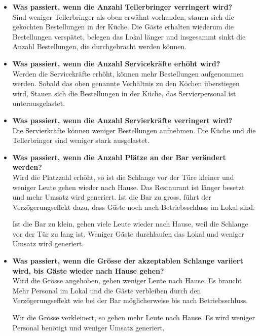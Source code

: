 \documentclass[ngerman,a4paper,12pt]{scrreprt}
\begin{document}
\begin{itemize}
			\item \textbf{Was passiert, wenn die Anzahl Tellerbringer verringert wird?}\\
				Sind weniger Tellerbringer als oben erwähnt vorhanden, stauen sich die gekochten Bestellungen in der Küche. Die Gäste erhalten wiederum die Bestellungen verspätet, belegen das Lokal länger und insgesammt sinkt die Anzahl Bestellungen, die durchgebracht werden können.
			\item \textbf{Was passiert, wenn die Anzahl Servicekräfte erhöht wird?}\\
				Werden die Servicekräfte erhöht, können mehr Bestellungen aufgenommen werden. Sobald das oben genannte Verhältnis zu den Köchen überstiegen wird, Stauen sich die Bestellungen in der Küche, das Servierpersonal ist unterausgelastet.
			\item \textbf{Was passiert, wenn die Anzahl Servierkräfte verringert wird?}\\
				Die Servierkräfte können weniger Bestellungen aufnehmen. Die Küche und die Tellerbringer sind weniger stark ausgelastet.
			\item \textbf{Was passiert, wenn die Anzahl Plätze an der Bar verändert werden?}\\
				Wird die Platzzahl erhöht, so ist die Schlange vor der Türe kleiner und weniger Leute gehen wieder nach Hause. Das Restaurant ist länger besetzt und mehr Umsatz wird generiert. Ist die Bar zu gross, führt der Verzögerungseffekt dazu, dass Gäste noch nach Betriebsschluss im Lokal sind.
				
				Ist die Bar zu klein, gehen viele Leute wieder nach Hause, weil die Schlange vor der Tür zu lang ist. Weniger Gäste durchlaufen das Lokal und weniger Umsatz wird generiert.
			\item \textbf{Was passiert, wenn die Grösse der akzeptablen Schlange variiert wird, bis Gäste wieder nach Hause gehen?}\\
				Wird die Grösse angehoben, gehen weniger Leute nach Hause. Es braucht Mehr Personal im Lokal und die Gäste verbleiben durch den Verzögerungseffekt wie bei der Bar möglicherweise bis nach Betriebsschluss.
				
				Wir die Grösse verkleinert, so gehen mehr Leute nach Hause. Es wird weniger Personal benötigt und weniger Umsatz generiert.
		\end{itemize}
\end{document}
